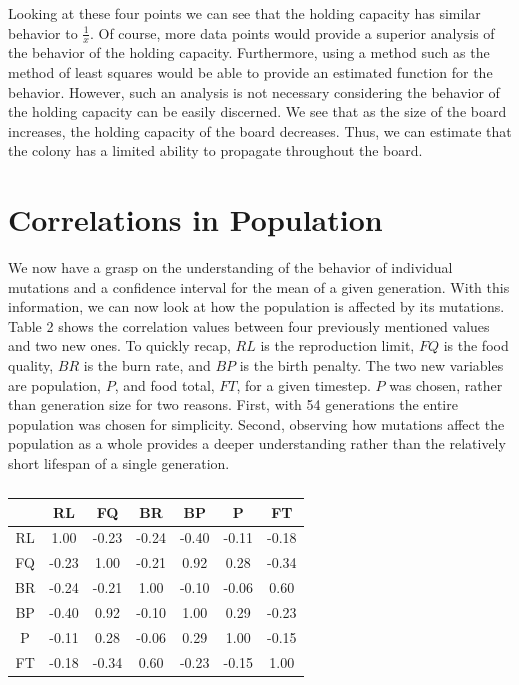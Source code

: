 \documentclass[12pt]{article}
\begin{document}
	Looking at these four points we can see that the holding capacity has similar behavior to $\frac{1}{x}$.
	Of course, more data points would provide a superior analysis of the behavior of the holding capacity. 
	Furthermore, using a method such as the method of least squares would be able to provide an estimated function for the behavior.
	However, such an analysis is not necessary considering the behavior of the holding capacity can be easily discerned.
	We see that as the size of the board increases, the holding capacity of the board decreases.
	Thus, we can estimate that the colony has a limited ability to propagate throughout the board.

\section{Correlations in Population}

	We now have a grasp on the understanding of the behavior of individual mutations and a confidence interval for the mean of a given generation.
	With this information, we can now look at how the population is affected by its mutations.
	Table 2 shows the correlation values between four previously mentioned values and two new ones. 
	To quickly recap, $RL$ is the reproduction limit, $FQ$ is the food quality, $BR$ is the burn rate, and $BP$ is the birth penalty.
	The two new variables are population, $P$, and food total, $FT$, for a given timestep.
	$P$ was chosen, rather than generation size for two reasons. 
	First, with 54 generations the entire population was chosen for simplicity. 
	Second, observing how mutations affect the population as a whole provides a deeper understanding rather than the relatively short lifespan of a single generation.
	
\begin{table}[H]
	\caption{}
	\label{fig: Table 2}
    \centering
    \begin{tabular}{|c|c|c|c|c|c|c|}
    \hline
        ~ & RL & FQ & BR & BP & P & FT \\ \hline
        RL & 1.00 & -0.23 & -0.24 & -0.40 & -0.11 & -0.18 \\ \hline
        FQ & -0.23 & 1.00 & -0.21 & 0.92 & 0.28 & -0.34 \\ \hline
        BR & -0.24 & -0.21 & 1.00 & -0.10 & -0.06 & 0.60 \\ \hline
        BP & -0.40 & 0.92 & -0.10 & 1.00 & 0.29 & -0.23 \\ \hline
        P & -0.11 & 0.28 & -0.06 & 0.29 & 1.00 & -0.15 \\ \hline
        FT & -0.18 & -0.34 & 0.60 & -0.23 & -0.15 & 1.00 \\ \hline
    \end{tabular}
\end{table}
\end{document}
